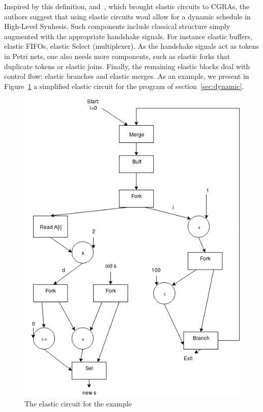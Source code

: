 \documentclass{article}
\begin{document}
Inspired by this definition, and~\cite{DBLP:conf/fpga/HuangITCW13}, which brought elastic circuits to CGRAs, the authors suggest that using elastic circuits woul allow for a dynamic schedule in High-Level Synhesis.
Such components include classical structure simply augmented with the appropriate handshake signals. For instance elastic buffers, elastic FIFOs, elastic Select (multiplexer). As the handshake signals act as tokens in Petri nets, one also needs more components, such as elastic forks that duplicate tokens or elastic joins. Finally, the remaining elastic blocks deal with control flow: elastic branches and elastic merges.
As an example, we present in Figure~\ref{fig:elastic} a simplified elastic circuit for the program of section~\ref{sec:dynamic}.
\begin{figure}
  \center
  \includegraphics[scale=0.3]{circuit.png}
  \caption{The elastic circuit for the example}
  \label{fig:elastic}
\end{figure}
\end{document}
